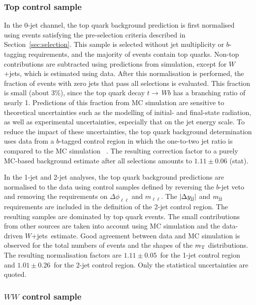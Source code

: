 \documentclass[final,3p,times,twocolumn]{elsarticle}
\newcommand{\ZeroJet}{\mbox{0-jet}}
\newcommand{\OneJet}{\mbox{1-jet}}
\newcommand{\TwoJet}{\mbox{2-jet}}
\def\TopSFonejet{\ensuremath{1.11 \pm  0.05}}
\def\TopSFtwojet{\ensuremath{1.01 \pm  0.26}}
\newcommand{\Wjets}{$W$+jets}
\newcommand{\ttoWb}{t{\rightarrow\,}Wb}
\begin{document}
\subsubsection{Top control sample}
\label{sec:top-control}

In the \ZeroJet{} channel, the top quark background prediction is first normalised using
events satisfying the pre-selection criteria described in Section~\ref{sec:selection}. 
This sample is selected without jet multiplicity or $b$-tagging requirements, and the majority of
events contain top quarks.  Non-top contributions are subtracted using predictions
from simulation, except for \Wjets, which is estimated using data.  After this normalisation is performed, 
the fraction of events with zero jets that pass all selections is evaluated. This fraction is small (about 3\%),
since the top quark decay $\ttoWb$ has a branching ratio of nearly 1.
Predictions of this fraction from MC simulation are sensitive to theoretical uncertainties such 
as the modelling of initial- and final-state radiation, 
as well as experimental uncertainties, especially that on the jet energy scale. 
To reduce the impact of these uncertainties,  the top quark background determination uses 
data from a $b$-tagged control region in which the one-to-two jet ratio 
is compared to the MC simulation ~\cite{Aad:2011qi}.
The resulting correction factor to a purely MC-based background estimate after all selections amounts to
$1.11 \pm 0.06$ (stat).

In the \OneJet{} and \TwoJet{} analyses, the top quark background predictions are 
normalised to the data using control samples defined by reversing the $b$-jet
veto and removing the requirements on $\Delta\phi_{\ell\ell}$ and $m_{\ell\ell}$.
The $|\Delta y_{\rm jj}|$ and $m_{\rm jj}$ requirements are included in the
definition of the 2-jet control region.
The resulting samples are dominated by top quark events.  
The small contributions from other sources are taken into account   
using MC simulation and the data-driven \Wjets\ estimate.
Good agreement between data and MC simulation is observed for the total numbers of events and the 
shapes of the $m_{\rm T}$ distributions.
The resulting normalisation factors are \TopSFonejet\ for the \OneJet{} control region and 
\TopSFtwojet\ for the \TwoJet{} control region. Only the statistical uncertainties are quoted.

\subsubsection{$WW$ control sample}
\label{sec:WW-control}
\end{document}
